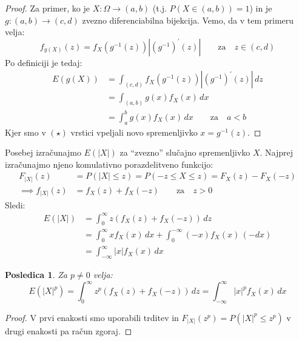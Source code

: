 \documentclass[12pt]{book}
\theoremstyle{definition}
\theoremstyle{plain}
\theoremstyle{plain}
\theoremstyle{plain}
\newtheorem{posledica}{Posledica}
\theoremstyle{remark}
\begin{document}
\begin{proof}
    Za primer, ko je $X: \Omega \to (a, b)$ (t.j. $P(X \in (a,b))= 1$) in je $g:(a, b) \to (c, d)$ zvezno diferenciabilna bijekcija. Vemo, da v tem primeru velja: 
    $$
    f_{g(X)}(z)=f_X\left(g^{-1}(z)\right)\left|\left(g^{-1}\right)^{\prime}(z)\right| \qquad \text{za} \quad z \in (c,d)
    $$  
    Po definiciji je tedaj: 
    \begin{align*}
        E(g(X))&=\int_{(c,d)} f_X\left(g^{-1}(z)\right)\left|\left(g^{-1}\right)^{\prime}(z)\right| \, d z \tag{$\star$} \\
        &=\int_{(a, b)} g(x) f_X(x) \, d x \\
        &=\int_a^b g(x) f_X(x) \, d x \qquad \text{za} \quad a<b
    \end{align*}
    Kjer smo v $(\star)$ vrstici vpeljali novo spremenljivko $x=g^{-1}(z)$.
\end{proof}

\begin{zgled}
    Posebej izračunajmo $E(|X|)$ za “zvezno” slučajno spremenljivko $X$. Najprej izračunajmo njeno komulativno porazdelitveno funkcijo: 
    $$
    \begin{aligned}
        F_{|X|}(z)&=P(|X| \leq z)=P(-z \leq X \leq z)=F_X(z)-F_X(-z) \\
        \implies f_{|X|}(z)&=f_X(z)+f_X(-z) \qquad \text{za} \quad z>0
    \end{aligned}
    $$
    Sledi: 
    $$
    \begin{aligned}
        E(|X|)&=\int_0^{\infty} z \left( f_X(z)+f_X(-z) \right) \, d z \\
        &=\int_0^{\infty} x f_X(x) \, d x+\int_0^{-\infty}(-x) f_X(x) \, (-d x) \\
        &=\int_{-\infty}^{\infty}|x| f_X(x) \, d x
    \end{aligned}
    $$
\end{zgled}

\begin{posledica}
    Za $p \neq 0$ velja: 
    $$
    E\left(|X|^p\right)=\int_{0}^{\infty}z^p\left(f_X(z)+f_X(-z)\right) \, d z=\int_{-\infty}^{\infty}|x|^p f_X(x) \, d x
    $$
\end{posledica}

\begin{proof}
    V prvi enakosti smo uporabili trditev in $F_{|X|}\left(z^p\right)= P\left(|X|^p \leq z^p\right)$ v drugi enakosti pa račun zgoraj. 
\end{proof}
\end{document}
